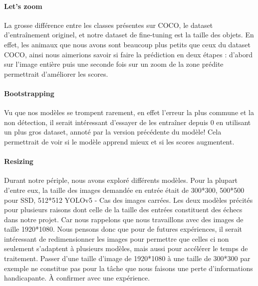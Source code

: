 \paragraph{Let's zoom} La grosse différence entre les classes présentes sur COCO, le dataset d'entraînement originel, et notre dataset de fine-tuning est la taille des objets. En effet, les animaux que nous avons sont beaucoup plus petits que ceux du dataset COCO, ainsi nous aimerions savoir si faire la prédiction en deux étapes : d'abord sur l'image entière puis une seconde fois sur un zoom de la zone prédite permettrait d'améliorer les scores.

\paragraph{Bootstrapping} Vu que nos modèles se trompent rarement, en effet l'erreur la plus commune et la non détection, il serait intéressant d'essayer de les entraîner depuis $0$ en utilisant un plus gros dataset, annoté par la version précédente du modèle! Cela permettrait de voir si le modèle apprend mieux et si les scores augmentent.

\paragraph{Resizing} Durant notre périple, nous avons exploré différents modèles. Pour la plupart d'entre eux, la taille des images demandée en entrée était de 300*300, 500*500 pour SSD, 512*512 YOLOv5 - Cas des images carrées. Les deux modèles précités pour plusieurs raisons dont celle de la taille des entrées constituent des échecs dans notre projet. Car nous rappelons que nous travaillons avec des images de taille 1920*1080. Nous pensons donc que pour de futures expériences, il serait intéressant de redimensionner les images pour permettre que celles ci non seulement s'adaptent à plusieurs modèles, mais aussi pour accélérer le temps de traitement. Passer d'une taille d'image de 1920*1080 à une taille de 300*300 par exemple ne constitue pas pour la tâche que nous faisons une perte d'informations handicapante. À confirmer avec une expérience. 

